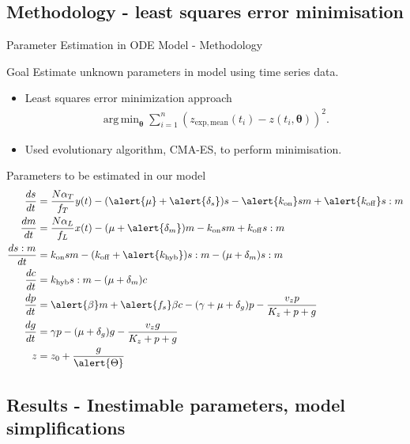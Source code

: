 \documentclass{beamer}
\DeclareMathOperator*{\argmin}{arg\,min}
\begin{document}
\subsection{Methodology - least squares error minimisation}

\begin{frame}{Parameter Estimation in ODE Model - Methodology}
  \begin{block}{Goal}
 Estimate unknown parameters in model using time series data.
    \end{block}
    
      \begin{itemize}
    \item  Least squares error minimization approach
    \begin{align*}
\argmin_{\boldsymbol{\theta}} \sum_{i =1}^{n} (z_{\mathrm{exp, mean}}(t_{i}) - z(t_{i},\boldsymbol{\theta}))^2.
\end{align*}
\item Used evolutionary algorithm, CMA-ES, to perform minimisation.
    \end{itemize}
\end{frame}

\small
\begin{frame}{Parameters to be estimated in our model}
\begin{align*} 
\frac{ds}{dt} &= \frac{N\alpha_{T}}{f_{T}} y(t)-(\alert{\mu} + \alert{\delta_{s}})s -\alert{k_{\mathrm{on}}}sm +\alert{k_{\mathrm{off}}}s:m \\
\frac{dm}{dt} &=  \frac{N\alpha_{L}}{f_{L}}x(t)-(\mu + \alert{\delta_{m}})m -k_{\mathrm{on}}sm +k_{\mathrm{off}}s:m  \\
\frac{ds:m}{dt} & = k_{\mathrm{on}}sm  - (k_{\mathrm{off}}+ \alert{k_{\mathrm{hyb}}})s:m  -(\mu + \delta_{m} )s:m \\
\frac{dc}{dt} & = k_{\mathrm{hyb}}s:m  -(\mu + \delta_{m})c  \\
\frac{dp}{dt} & = \alert{\beta} m +\alert{f_{s}}\beta c -(\gamma + \mu + \delta_{g})p - \frac{v_{z}p}{K_{z}+p+g}   \\
\frac{dg}{dt} & = \gamma p - (\mu + \delta_{g})g - \frac{v_{z}g}{K_{z}+p+g} \\
z &= z_{0} +\frac{g}{\alert{\Theta}} 
\end{align*}
\end{frame}
\normalsize


\subsection{Results - Inestimable parameters, model simplifications}
\end{document}
